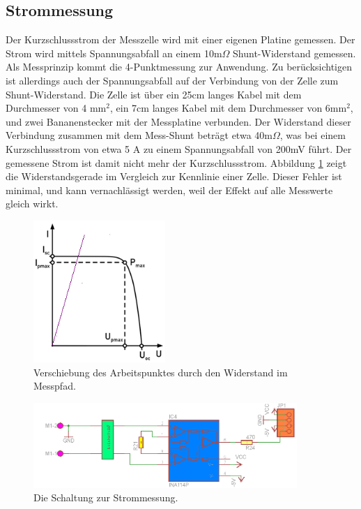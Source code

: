 \documentclass[a4paper,bibtotoc,oneside]{scrbook}
\begin{document}
\subsection{Strommessung}\thispagestyle{empty}
Der Kurzschlussstrom der Messzelle wird mit einer eigenen Platine gemessen. Der Strom wird mittels Spannungsabfall an einem 10m$\Omega$ Shunt-Widerstand gemessen. Als Messprinzip kommt die 4-Punktmessung zur Anwendung.  Zu berücksichtigen ist allerdings auch der Spannungsabfall auf der Verbindung von der Zelle zum Shunt-Widerstand. Die Zelle ist über ein 25cm langes Kabel mit dem Durchmesser von 4 mm$^2$, ein 7cm langes Kabel mit dem Durchmesser von 6mm$^2$, und zwei Bananenstecker mit der Messplatine verbunden. Der Widerstand dieser Verbindung zusammen mit dem Mess-Shunt beträgt etwa 40m$\Omega$, was bei einem Kurzschlussstrom von etwa 5 A zu einem Spannungsabfall von 200mV führt. Der gemessene Strom ist damit nicht mehr der Kurzschlussstrom. Abbildung \ref{kenn2} zeigt die Widerstandsgerade im Vergleich zur Kennlinie einer Zelle. 
Dieser Fehler ist minimal, und kann vernachlässigt werden, weil der Effekt auf alle Messwerte gleich wirkt.


\begin{figure}[htbp]
\centering
\includegraphics[width=50mm]{img/kenn2.png}
\caption{Verschiebung des Arbeitspunktes durch den Widerstand im Messpfad.}\label{kenn2}
\end{figure}

\begin{figure}[htbp]
\centering
\includegraphics[width=100mm]{img/i1.png}
\caption{Die Schaltung zur Strommessung.}\label{i1}
\end{figure}
\end{document}
